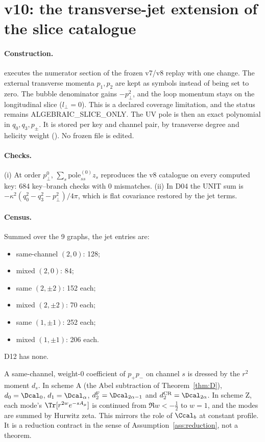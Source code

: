 \section{v10: the transverse-jet extension of the slice catalogue}
\label{sec:v10jet}

\paragraph{Construction.}
 executes the numerator section of the
frozen v7/v8 replay with one change. The external transverse momenta
\(p_1,p_2\) are kept as symbols instead of being set to zero. The
bubble denominator gains \(-p_\perp^2\), and the loop momentum stays
on the longitudinal slice (\(l_\perp=0\)). This is a declared
coverage limitation, and the status remains
\textsf{ALGEBRAIC\_SLICE\_ONLY}. The UV pole is then an exact
polynomial in \(q_0,q_3,p_\pm\). It is stored per key and channel
pair, by transverse degree and helicity weight
(). No frozen file is edited.

\paragraph{Checks.}
(i) At order \(p_\perp^0\), \(\sum_s\mathrm{pole}^{(0)}_{ss}z_s\)
reproduces the v8 catalogue on every computed key: 684 key--branch
checks with 0 mismatches. (ii) In D04 the UNIT sum is
\(-\kappa^2(q_0^2-q_3^2-p_\perp^2)/4\pi\), which is flat
covariance restored by the jet terms.

\paragraph{Census.}
Summed over the 9 graphs, the jet entries are:
\begin{itemize}
\item same-channel \((2,0)\): 128;
\item mixed \((2,0)\): 84;
\item same \((2,\pm2)\): 152 each;
\item mixed \((2,\pm2)\): 70 each;
\item same \((1,\pm1)\): 252 each;
\item mixed \((1,\pm1)\): 206 each.
\end{itemize}
D12 has none.

\begin{definition}
A same-channel, weight-0 coefficient of \(p_+p_-\) on channel \(s\)
is dressed by the \(r^2\) moment \(d_s\). In scheme A (the Abel
subtraction of Theorem~\ref{thm:D}),
\(d_0=\Dcal_0\), \(d_1=\Dcal_\alpha\),
\(d_2^{\rm F}=\Dcal_{2\alpha-1}\) and
\(d_2^{\rm CR}=\Dcal_{2\alpha}\). In scheme Z, each mode's
\(\Tr[r^{2w}e^{-sA_\mu}]\) is continued from \(\Re w<-\tfrac12\) to
\(w=1\), and the modes are summed by Hurwitz zeta. This mirrors the
role of \(\Ccal_b\) at constant profile. It is a reduction contract
in the sense of Assumption~\ref{ass:reduction}, not a theorem.
\end{definition}

